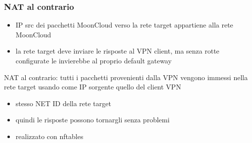 

\begin{frame}
	\frametitle{NAT al contrario}
	
	\begin{itemize}
		\item IP src dei pacchetti MoonCloud verso la rete target
		      appartiene alla rete MoonCloud
		\item la rete target deve inviare le risposte al VPN client, ma senza
		      rotte configurate le invierebbe al proprio default gateway
	\end{itemize}
	
	\alert{NAT al contrario}: tutti i pacchetti provenienti dalla VPN vengono
	immessi nella rete target usando come IP sorgente quello del client VPN
	\begin{itemize}
		\item stesso NET ID della rete target
		\item quindi le risposte possono tornargli senza problemi
		\item realizzato con \alert{nftables}
	\end{itemize}
\end{frame}

